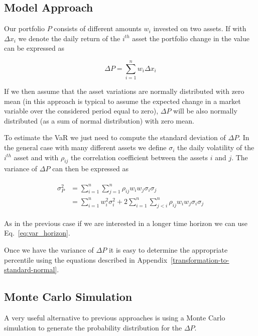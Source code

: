 \subsection{Model Approach}\label{model-approach}

Our portfolio $P$ consists of different amounts $w_i$ invested on two assets. If with $\Delta x_i$ we denote the daily return of the $i^{th}$ asset the portfolio change in the value can be expressed as

\begin{equation}
\Delta P = \sum_{i=1}^n w_i \Delta x_i
\end{equation}

If we then assume that the asset variations are normally distributed
with zero mean (in this approach is typical to assume the expected change
in a market variable over the considered period equal to zero), \(\Delta P\) will
be also normally distributed (as a sum of normal distribution) with zero
mean.

To estimate the VaR we just need to compute the standard deviation of
$\Delta P$. In the general case with many different assets we define
$\sigma_i$ the daily volatility of the $i^{th}$ asset and with
$\rho_{ij}$ the correlation coefficient between the assets $i$ and $j$.
The variance of $\Delta P$ can then be expressed as

\begin{align}
\begin{split}
\sigma^2_P & = \sum_{i=1}^{n}\sum_{j=1}^{n}\rho_{ij}w_i w_j \sigma_i \sigma_j \\
& = \sum_{i=1}^{n} w_i^2 \sigma_i^2 + 2 \sum_{i=1}^{n}\sum_{j<i}^{n}\rho_{ij}w_i w_j \sigma_i \sigma_j 
\end{split}
\end{align}

As in the previous case if we are interested in a longer time horizon we
can use Eq.~\ref{eq:var_horizon}.

Once we have the variance of \(\Delta P\) it is easy to determine the appropriate percentile using the equations described in Appendix~\ref{transformation-to-standard-normal}.

\subsection{Monte Carlo Simulation}\label{monte-carlo-simulation}

A very useful alternative to previous approaches is using a Monte Carlo simulation to generate the probability distribution for the $\Delta P$. 

